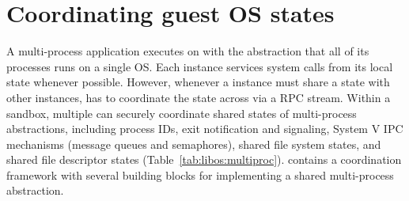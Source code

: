 \section{Coordinating guest OS states}
\label{sec:libos:namespaces}



A multi-process application executes on \graphene{} 
with the abstraction that all of its processes runs on a single OS.
Each \thelibos{} instance services system calls
from its local state whenever possible.
However, whenever a \thelibos{} instance must share a \libos{} state with other instances,
\thelibos{} has to coordinate the state across \picoprocs{}
via a RPC stream.
Within a sandbox, multiple \picoprocs{} 
can securely coordinate shared states of multi-process abstractions, including process IDs, exit notification and signaling, 
System V IPC mechanisms (message queues and semaphores), shared file system states, and shared file descriptor states (Table~\ref{tab:libos:multiproc}).
\thelibos{} contains a coordination framework
with several building blocks for implementing a shared multi-process abstraction.

